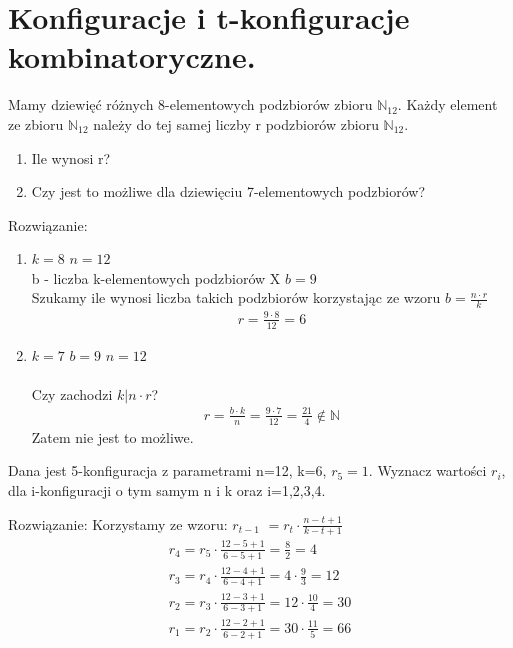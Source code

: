 \documentclass[12pt]{article}
\begin{document}
    \section{Konfiguracje i t-konfiguracje kombinatoryczne.}

    \begin{exercise}
        Mamy dziewięć różnych 8-elementowych podzbiorów zbioru $\mathbb{N}_{12}$. Każdy element ze zbioru $\mathbb{N}_{12}$ należy do tej samej liczby r podzbiorów zbioru $\mathbb{N}_{12}$.
        \begin{enumerate}
            \item Ile wynosi r?
            \item Czy jest to możliwe dla dziewięciu 7-elementowych podzbiorów?
        \end{enumerate}
    \end{exercise}
    Rozwiązanie:
    \begin{enumerate}
        \item $k = 8$ \quad $n = 12$\\
        b - liczba k-elementowych podzbiorów X
        $b = 9$ \\
        Szukamy ile wynosi liczba takich podzbiorów korzystając ze wzoru $b=\frac{n\cdot r}{k}$
        \begin{align*}
            r=\frac{9 \cdot 8}{12} = 6
        \end{align*}
        \item $k = 7$ \quad $b=9$ \quad $n=12$\\\\
        Czy zachodzi $k|n \cdot r$?
        \begin{align*}
            r=\frac{b \cdot k}{n} = \frac{9 \cdot 7}{12} = \frac{21}{4} \notin \mathbb{N}
        \end{align*}
        Zatem nie jest to możliwe.
    \end{enumerate}


    \begin{exercise}
        Dana jest 5-konfiguracja z parametrami n=12, k=6, $r_5=1$. Wyznacz wartości $r_i$, dla i-konfiguracji o tym samym n i k oraz i=1,2,3,4.
    \end{exercise}
    Rozwiązanie:
    Korzystamy ze wzoru: $r_{t-1}$ $= r_t \cdot \frac{n-t+1}{k-t+1}$
    \begin{align*}
        r_4 = r_5\cdot \frac{12-5+1}{6-5+1} = \frac{8}{2} = 4 \\
        r_3 = r_4\cdot \frac{12-4+1}{6-4+1} = 4 \cdot \frac{9}{3} = 12 \\
        r_2 = r_3\cdot \frac{12-3+1}{6-3+1} = 12 \cdot \frac{10}{4} = 30 \\
        r_1 = r_2\cdot \frac{12-2+1}{6-2+1} = 30 \cdot \frac{11}{5} = 66 \\
    \end{align*}
\end{document}
